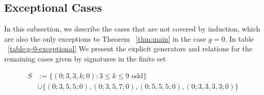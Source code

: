 \documentclass{amsart}
\theoremstyle{plain}
\theoremstyle{definition}
\theoremstyle{remark}
\numberwithin{equation}{section}
\newcommand\ssec{\subsection}
\newcommand\sx{\mathscr X}
\begin{document}



\ssec{Exceptional Cases}
\label{ssec:g-0-exceptional}
In this subsection, we describe the cases that are not covered by induction, which are also the only exceptions to Theorem ~\ref{thm:main} in the case $g = 0$.
In table ~\ref{table:g-0-exceptional} We present the explicit generators and relations for the remaining
cases given by signatures in the finite set

\begin{align*}
	S &:= \{(0; 3, 3, k; 0) : 3 \leq k \leq 9 \text{ odd}\} \\
		&\cup \{(0; 3, 5, 5; 0) ,(0; 3, 5, 7; 0), (0; 5, 5, 5; 0), (0; 3, 3, 3, 3; 0)\}
\end{align*}
\end{document}
